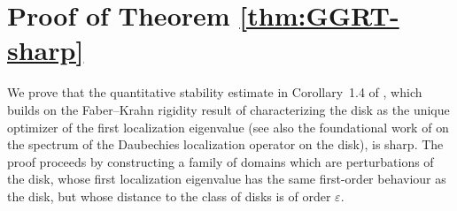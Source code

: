 \section{Proof of Theorem \ref{thm:GGRT-sharp}}

We prove that the quantitative stability estimate in Corollary~1.4 of
\cite{Gomez-Guerra-Ramos-Tilli}, which builds on the Faber--Krahn rigidity
result of \cite{Nicola-Tilli} characterizing the disk as the unique optimizer
of the first localization eigenvalue (see also the foundational work of
\cite{Daubechies} on the spectrum of the Daubechies localization operator on
the disk), is sharp. The proof proceeds by constructing a family of domains
which are perturbations of the disk, whose first localization eigenvalue has
the same first-order behaviour as the disk, but whose distance to the class of
disks is of order $\varepsilon$.

